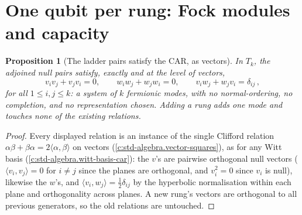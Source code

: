 \documentclass[11pt]{article}
\newtheorem{proposition}[theorem]{Proposition}
\theoremstyle{definition}
\theoremstyle{plain}
\newcommand{\changedmark}[2]{\marginpar{\raggedright\scriptsize\color{#1}#2}}
\begin{document}
\section{One qubit per rung: Fock modules and capacity}

\begin{proposition}[The ladder pairs satisfy the CAR, as vectors]\label{c:tower.ladder-pairs-satisfy-car-vectors}
\changedmark{gray}{reworded}
In $T_k$, the adjoined null pairs satisfy, exactly and at the level of vectors,
\[
v_i v_j + v_j v_i = 0, \qquad w_i w_j + w_j w_i = 0, \qquad v_i w_j + w_j v_i = \delta_{ij}\,,
\]
for all $1 \leq i, j \leq k$: a system of $k$ fermionic modes, with no normal-ordering, no completion, and no representation chosen. Adding a rung adds one mode and touches none of the existing relations.
\end{proposition}
\begin{proof}
Every displayed relation is an instance of the single Clifford relation $\alpha\beta + \beta\alpha = 2\langle\alpha, \beta\rangle$ on vectors (\ref{c:std-algebra.vector-squares}), as for any Witt basis (\ref{c:std-algebra.witt-basis-car}): the $v$'s are pairwise orthogonal null vectors ($\langle v_i, v_j \rangle = 0$ for $i \neq j$ since the planes are orthogonal, and $v_i^2 = 0$ since $v_i$ is null), likewise the $w$'s, and $\langle v_i, w_j \rangle = \tfrac12\delta_{ij}$ by the hyperbolic normalisation within each plane and orthogonality across planes. A new rung's vectors are orthogonal to all previous generators, so the old relations are untouched.

\end{proof}
\end{document}
